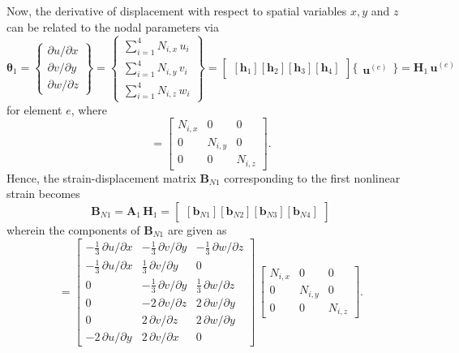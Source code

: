 Now, the derivative of displacement with respect to spatial variables $x, y$ and $z$ can be related to the nodal parameters via
\small
\begin{equation}
\boldsymbol{\theta}_1 =  \begin{Bmatrix}
\partial u / \partial x\\
\partial v / \partial y \\
\partial w / \partial z
\end{Bmatrix}
= \begin{Bmatrix}
\sum\nolimits_{i=1}^4 N_{i,x} \, u_i\\
\sum\nolimits_{i=1}^4 N_{i,y} \, v_i \\
\sum\nolimits_{i=1}^4 N_{i,z} \, w_i
\end{Bmatrix} 
= \begin{bmatrix}
[\mathbf{h}_1] [\mathbf{h}_2] [\mathbf{h}_3] [\mathbf{h}_4]
\end{bmatrix} \bigl\{ \begin{matrix} \mathbf{u}^{(e)} \end{matrix} \bigr\}  
= \mathbf{H}_1 \, \mathbf{u}^{(e)} 
\end{equation}
\normalsize
for element $e$, where 
\begin{equation}
[\mathbf{h}_i] = \begin{bmatrix}
N_{i,x} &  0 & 0  \\
0 & N_{i,y} & 0  \\
0 & 0 & N_{i,z}\end{bmatrix} .
\end{equation}
Hence, the strain-displacement matrix $\mathbf{B}_{N1}$ corresponding to the first nonlinear strain becomes
\begin{equation}
\mathbf{B}_{N1} = \mathbf{A}_1 \, \mathbf{H}_1 = \begin{bmatrix}
[\mathbf{b}_{N1}] [\mathbf{b}_{N2}] [\mathbf{b}_{N3}] [\mathbf{b}_{N4}] 
\end{bmatrix} 
\end{equation}
wherein the components of $\mathbf{B}_{N1}$ are given as
\begin{equation}
[\mathbf{b}_i] = \begin{bmatrix}
	-\tfrac{1}{3} \, \partial u / \partial x &  - \tfrac{1}{3} \, \partial v / \partial y & -\tfrac{1}{3} \, \partial w / \partial z  \\
	-\tfrac{1}{3} \, \partial u / \partial x &  \tfrac{1}{3} \, \partial v / \partial y & 0  \\
	0  & -\tfrac{1}{3} \, \partial v / \partial y & \tfrac{1}{3} \, \partial w / \partial z \\
	0 &  - 2 \, \partial v / \partial z &  2 \,  \partial w / \partial y  \\
	0 &  2 \, \partial v / \partial z  & 2 \,  \partial w / \partial y  \\
	- 2 \, \partial u / \partial y &   2 \, \partial v / \partial x & 0   \end{bmatrix}  \, \begin{bmatrix}
N_{i,x} &  0 & 0  \\
0 & N_{i,y} & 0  \\
0 & 0 & N_{i,z} \end{bmatrix}. 
\end{equation}

